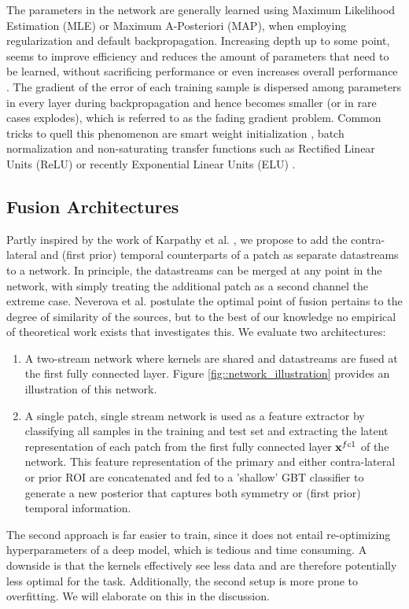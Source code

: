 \documentclass[12pt]{spieman}  %
\begin{document}
The parameters in the network are generally learned using Maximum Likelihood Estimation (MLE) or Maximum A-Posteriori (MAP), when employing regularization and default backpropagation. Increasing depth up to some point, seems to improve efficiency and reduces the amount of parameters that need to be learned, without sacrificing performance or even increases overall performance \cite{Sriv15, Simo14, He15b}. The gradient of the error of each training sample is dispersed among parameters in every layer during backpropagation and hence becomes smaller (or in rare cases explodes), which is referred to as the fading gradient problem. Common tricks to quell this phenomenon are smart weight initialization \cite{Glor10, He15}, batch normalization \cite{Ioff15} and non-saturating transfer functions such as Rectified Linear Units (ReLU) or recently Exponential Linear Units (ELU) \cite{Clev15}. 

\subsection{Fusion Architectures}
\label{sec::fusion_architectures}
Partly inspired by the work of Karpathy et al. \cite{Karp14}, we propose to add the contra-lateral and (first prior) temporal counterparts of a patch as separate datastreams to a network. In principle, the datastreams can be merged at any point in the network, with simply treating the additional patch as a second channel the extreme case. Neverova et al. \cite{Neve14} postulate the optimal point of fusion pertains to the degree of similarity of the sources, but to the best of our knowledge no empirical of theoretical work exists that investigates this. We evaluate two architectures:
\begin{enumerate}
 \item A two-stream network where kernels are shared and datastreams are fused at the first fully connected layer. Figure \ref{fig::network_illustration} provides an illustration of this network. 
 \item A single patch, single stream network is used as a feature extractor by classifying all samples in the training and test set and extracting the latent representation of each patch from the first fully connected layer ${\bf x}^{fc1}$ of the network. This feature representation of the primary and either contra-lateral or prior ROI are concatenated and fed to a 'shallow' GBT classifier to generate a new posterior that captures both symmetry or (first prior) temporal information.
\end{enumerate}
The second approach is far easier to train, since it does not entail re-optimizing hyperparameters of a deep model, which is tedious and time consuming. A downside is that the kernels effectively see less data and are therefore potentially less optimal for the task. Additionally, the second setup is more prone to overfitting. We will elaborate on this in the discussion. \\
\end{document}
